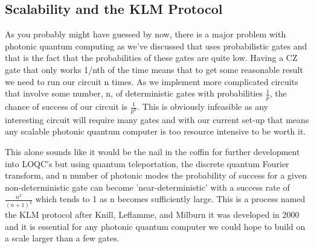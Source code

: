 \subsection{Scalability and the KLM Protocol}
As you probably might have guessed by now, there is a major problem with photonic quantum computing as we've discussed that uses probabilistic gates and that is the fact that the probabilities of these gates are quite low. Having a CZ gate that only works 1/nth of the time means that to get some reasonable result we need to run our circuit n times. As we implement more complicated circuits that involve some number, n, of deterministic gates with probabilities $\frac{1}{p}$, the chance of success of our circuit is $\frac{1}{p^n}$. This is obviously infeasible as any interesting circuit will require many gates and with our current set-up that means any scalable photonic quantum computer is too resource intensive to be worth it. \par
This alone sounds like it would be the nail in the coffin for further development into LOQC's but using quantum teleportation, the discrete quantum Fourier transform, and n number of photonic modes the probability of success for a given non-deterministic gate can become 'near-deterministic' with a success rate of $\frac{n^2}{(n+1)^2}$ which tends to 1 as n becomes sufficiently large. This is a process named the KLM protocol after Knill, Leflamme, and Milburn it was developed in 2000 and it is essential for any photonic quantum computer we could hope to build on a scale larger than a few gates.

